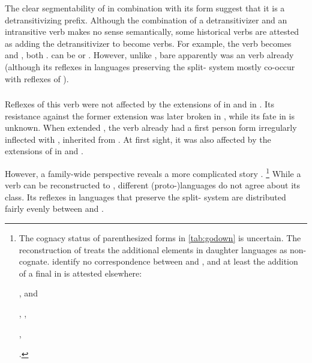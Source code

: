The clear segmentability of  in combination with its form suggest that it is a detransitivizing prefix.
Although the combination of a detransitivizer and an intransitive verb makes no sense semantically, some historical  verbs are attested as adding the detransitivizer to become  verbs.
For example, the \PC {} verb   becomes \trio {} \parencite[252]{triomeira1999} and \kalina {} \parencite[429]{courtz2008carib}, both .
\waiwai {} can be  \parencite[30]{waiwaihawkins1998} or  \parencite[204]{hawkins1953waiwai}.
However, unlike , bare   apparently was an  verb already (although its reflexes in languages preserving the split- system mostly co-occur with reflexes of ).

\subsubsection{ }
\label{sec:godown}
Reflexes of this verb were not affected by the extensions of  in \PPek {} and  in \akuriyo {}.
Its resistance against the former extension was later broken in \bakairi, while its fate in \ikpeng is unknown.
When \akuriyo extended , the verb already had a first person form irregularly inflected with , inherited from \PTir.
At first sight, it was also affected by the extensions of  in \carijo {} and \yukpa {}.


%
However, a family-wide perspective reveals a more complicated story .%
\footnote{
The cognacy status of parenthesized forms in \cref{tab:godown} is uncertain.
The reconstruction of \PPek {} treats the additional elements in daughter languages as non-cognate.
\textcite{meira2005southern} identify no correspondence between \bakairi {} and \ikpeng {}, and at least the addition of a final  in \PXin is attested elsewhere:
		\begin{inlinelist}
			\item \PC {} , \arara and \ikpeng {} %
			\item \PC {} , \arara {}, \ikpeng {} %
			\item \PC {} , \arara {}  %
		\end{inlinelist} \parencites[8]{gildea2007greenberg}[56, 144, 57]{alves2017arara}[25, 270]{ikpengpacheco2001}.}
While a verb  can be reconstructed to \PC, different (proto-)languages do not agree about its class.
Its reflexes in languages that preserve the split- system are distributed fairly evenly between  and .

